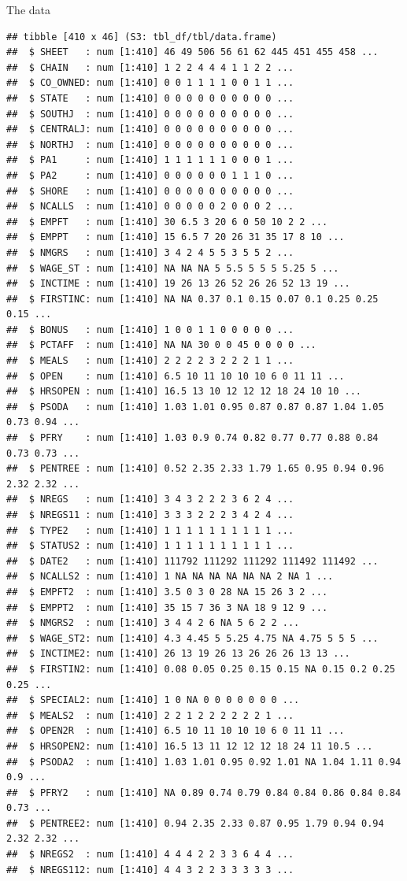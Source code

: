 \documentclass[
  ignorenonframetext,
]{beamer}
\begin{document}
\begin{frame}[fragile]{The data}
\begin{verbatim}
## tibble [410 x 46] (S3: tbl_df/tbl/data.frame)
##  $ SHEET   : num [1:410] 46 49 506 56 61 62 445 451 455 458 ...
##  $ CHAIN   : num [1:410] 1 2 2 4 4 4 1 1 2 2 ...
##  $ CO_OWNED: num [1:410] 0 0 1 1 1 1 0 0 1 1 ...
##  $ STATE   : num [1:410] 0 0 0 0 0 0 0 0 0 0 ...
##  $ SOUTHJ  : num [1:410] 0 0 0 0 0 0 0 0 0 0 ...
##  $ CENTRALJ: num [1:410] 0 0 0 0 0 0 0 0 0 0 ...
##  $ NORTHJ  : num [1:410] 0 0 0 0 0 0 0 0 0 0 ...
##  $ PA1     : num [1:410] 1 1 1 1 1 1 0 0 0 1 ...
##  $ PA2     : num [1:410] 0 0 0 0 0 0 1 1 1 0 ...
##  $ SHORE   : num [1:410] 0 0 0 0 0 0 0 0 0 0 ...
##  $ NCALLS  : num [1:410] 0 0 0 0 0 2 0 0 0 2 ...
##  $ EMPFT   : num [1:410] 30 6.5 3 20 6 0 50 10 2 2 ...
##  $ EMPPT   : num [1:410] 15 6.5 7 20 26 31 35 17 8 10 ...
##  $ NMGRS   : num [1:410] 3 4 2 4 5 5 3 5 5 2 ...
##  $ WAGE_ST : num [1:410] NA NA NA 5 5.5 5 5 5 5.25 5 ...
##  $ INCTIME : num [1:410] 19 26 13 26 52 26 26 52 13 19 ...
##  $ FIRSTINC: num [1:410] NA NA 0.37 0.1 0.15 0.07 0.1 0.25 0.25 0.15 ...
##  $ BONUS   : num [1:410] 1 0 0 1 1 0 0 0 0 0 ...
##  $ PCTAFF  : num [1:410] NA NA 30 0 0 45 0 0 0 0 ...
##  $ MEALS   : num [1:410] 2 2 2 2 3 2 2 2 1 1 ...
##  $ OPEN    : num [1:410] 6.5 10 11 10 10 10 6 0 11 11 ...
##  $ HRSOPEN : num [1:410] 16.5 13 10 12 12 12 18 24 10 10 ...
##  $ PSODA   : num [1:410] 1.03 1.01 0.95 0.87 0.87 0.87 1.04 1.05 0.73 0.94 ...
##  $ PFRY    : num [1:410] 1.03 0.9 0.74 0.82 0.77 0.77 0.88 0.84 0.73 0.73 ...
##  $ PENTREE : num [1:410] 0.52 2.35 2.33 1.79 1.65 0.95 0.94 0.96 2.32 2.32 ...
##  $ NREGS   : num [1:410] 3 4 3 2 2 2 3 6 2 4 ...
##  $ NREGS11 : num [1:410] 3 3 3 2 2 2 3 4 2 4 ...
##  $ TYPE2   : num [1:410] 1 1 1 1 1 1 1 1 1 1 ...
##  $ STATUS2 : num [1:410] 1 1 1 1 1 1 1 1 1 1 ...
##  $ DATE2   : num [1:410] 111792 111292 111292 111492 111492 ...
##  $ NCALLS2 : num [1:410] 1 NA NA NA NA NA NA 2 NA 1 ...
##  $ EMPFT2  : num [1:410] 3.5 0 3 0 28 NA 15 26 3 2 ...
##  $ EMPPT2  : num [1:410] 35 15 7 36 3 NA 18 9 12 9 ...
##  $ NMGRS2  : num [1:410] 3 4 4 2 6 NA 5 6 2 2 ...
##  $ WAGE_ST2: num [1:410] 4.3 4.45 5 5.25 4.75 NA 4.75 5 5 5 ...
##  $ INCTIME2: num [1:410] 26 13 19 26 13 26 26 26 13 13 ...
##  $ FIRSTIN2: num [1:410] 0.08 0.05 0.25 0.15 0.15 NA 0.15 0.2 0.25 0.25 ...
##  $ SPECIAL2: num [1:410] 1 0 NA 0 0 0 0 0 0 0 ...
##  $ MEALS2  : num [1:410] 2 2 1 2 2 2 2 2 2 1 ...
##  $ OPEN2R  : num [1:410] 6.5 10 11 10 10 10 6 0 11 11 ...
##  $ HRSOPEN2: num [1:410] 16.5 13 11 12 12 12 18 24 11 10.5 ...
##  $ PSODA2  : num [1:410] 1.03 1.01 0.95 0.92 1.01 NA 1.04 1.11 0.94 0.9 ...
##  $ PFRY2   : num [1:410] NA 0.89 0.74 0.79 0.84 0.84 0.86 0.84 0.84 0.73 ...
##  $ PENTREE2: num [1:410] 0.94 2.35 2.33 0.87 0.95 1.79 0.94 0.94 2.32 2.32 ...
##  $ NREGS2  : num [1:410] 4 4 4 2 2 3 3 6 4 4 ...
##  $ NREGS112: num [1:410] 4 4 3 2 2 3 3 3 3 3 ...
\end{verbatim}

\normalsize
\end{frame}
\end{document}

